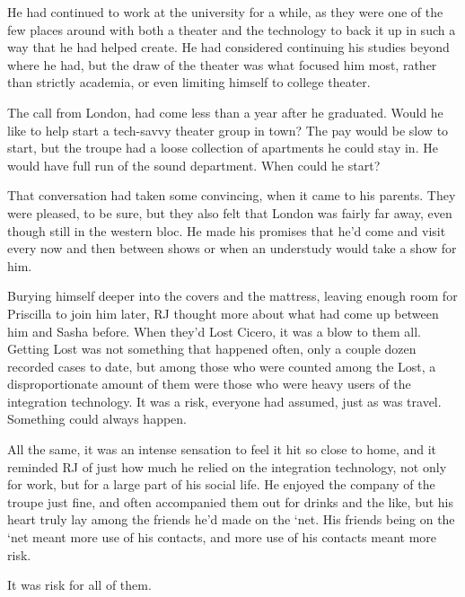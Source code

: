 He had continued to work at the university for a while, as they were one of the few places around with both a theater and the technology to back it up in such a way that he had helped create.  He had considered continuing his studies beyond where he had, but the draw of the theater was what focused him most, rather than strictly academia, or even limiting himself to college theater.

The call from London, had come less than a year after he graduated.  Would he like to help start a tech-savvy theater group in town?  The pay would be slow to start, but the troupe had a loose collection of apartments he could stay in.  He would have full run of the sound department.  When could he start?

That conversation had taken some convincing, when it came to his parents.  They were pleased, to be sure, but they also felt that London was fairly far away, even though still in the western bloc.  He made his promises that he'd come and visit every now and then between shows or when an understudy would take a show for him.

Burying himself deeper into the covers and the mattress, leaving enough room for Priscilla to join him later, RJ thought more about what had come up between him and Sasha before.  When they'd Lost Cicero, it was a blow to them all.  Getting Lost was not something that happened often, only a couple dozen recorded cases to date, but among those who were counted among the Lost, a disproportionate amount of them were those who were heavy users of the integration technology.  It was a risk, everyone had assumed, just as was travel.  Something could always happen.

All the same, it was an intense sensation to feel it hit so close to home, and it reminded RJ of just how much he relied on the integration technology, not only for work, but for a large part of his social life.  He enjoyed the company of the troupe just fine, and often accompanied them out for drinks and the like, but his heart truly lay among the friends he'd made on the `net.  His friends being on the `net meant more use of his contacts, and more use of his contacts meant more risk.

It was risk for all of them.
